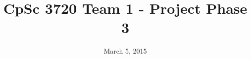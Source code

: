 \documentclass[11pt,openany]{report}
\begin{document}
\title{{\Huge CpSc 3720 Team 1 - Project Phase 3}}
\author{}
\date{March 5, 2015}
\maketitle


\end{document}

